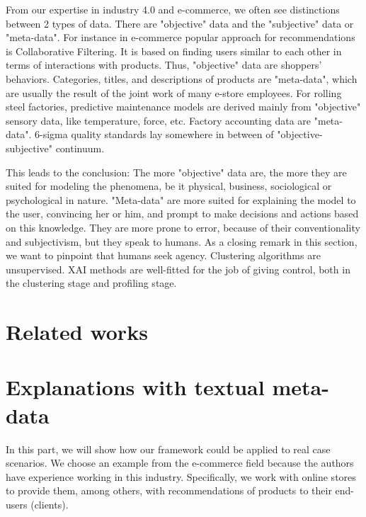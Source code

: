 \documentclass[
 twocolumn,
]{ceurart}
\begin{document}
From our expertise in industry 4.0 and e-commerce, we often see distinctions between 2 types of data.
There are "objective" data and the "subjective" data or "meta-data".
For instance in e-commerce popular approach for recommendations is Collaborative Filtering.
It is based on finding users similar to each other in terms of interactions with products.
Thus, "objective" data are shoppers' behaviors.
Categories, titles, and descriptions of products are "meta-data", which are usually the result of the joint work of many e-store employees.
For rolling steel factories, predictive maintenance models are derived mainly from "objective" sensory data, like temperature, force, etc.
Factory accounting data are "meta-data".
6-sigma quality standards lay somewhere in between of "objective-subjective" continuum.

This leads to the conclusion:
The more "objective" data are, the more they are suited for modeling the phenomena, be it physical, business, sociological or psychological in nature.
"Meta-data" are more suited for explaining the model to the user, convincing her or him, and prompt to make decisions and actions based on this knowledge.
They are more prone to error, because of their conventionality and subjectivism, but they speak to humans.
As a closing remark in this section, we want to pinpoint that humans seek agency.
Clustering algorithms are unsupervised.
XAI methods are well-fitted for the job of giving control, both in the clustering stage and profiling stage.

\section{Related works}

\section{Explanations with textual meta-data}
In this part, we will show how our framework could be applied to real case scenarios.
We choose an example from the e-commerce field because the authors have experience working in this industry.
Specifically, we work with online stores to provide them, among others, with recommendations of products to their end-users (clients).
\end{document}
